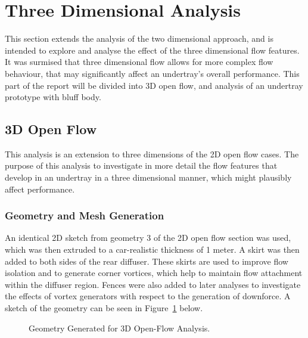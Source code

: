 \section{Three Dimensional Analysis}
\noindent This section extends the analysis of the two dimensional approach, and is intended to explore and analyse the effect of the three dimensional flow features. It was surmised that three dimensional flow allows for more complex flow behaviour, that may significantly affect an undertray's overall performance. This part of the report will be divided into 3D open flow, and analysis of an undertray prototype with bluff body.

\subsection{3D Open Flow}
This analysis is an extension to three dimensions of the 2D open flow cases. The purpose of this analysis to investigate in more detail the flow features that develop in an undertray in a three dimensional manner, which might plausibly affect performance.

\subsubsection{Geometry and Mesh Generation}
An identical 2D sketch from geometry 3 of the 2D open flow section was used, which was then extruded to a car-realistic thickness of 1 meter. A skirt was then added to both sides of the rear diffuser. These skirts are used to improve flow isolation and to generate corner vortices, which help to maintain flow attachment within the diffuser region. Fences were also added to later analyses to investigate the effects of vortex generators with respect to the generation of downforce. A sketch of the geometry can be seen in Figure~\ref{fig:3D_OF_GEOM} below. 

\begin{figure}[!h]
    \centering
    \noindent{}
    \caption{Geometry Generated for 3D Open-Flow Analysis.}
    \label{fig:3D_OF_GEOM}
\end{figure}

